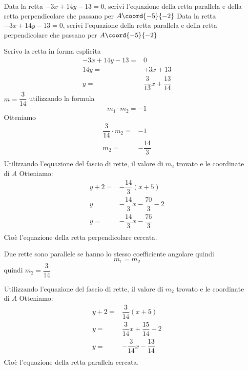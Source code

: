 \begin{exercise}
	Data la retta $-3x+14y-13=0$, scrivi l'equazione della retta parallela e della retta perpendicolare che passano per  $A\coord{-5}{-2}$
	\tcblower
	Data la retta $-3x+14y-13=0$, scrivi l'equazione della retta parallela e della retta perpendicolare che passano per  $A\coord{-5}{-2}$
	
	Scrivo la retta in forma esplicita
	\begin{align*}
		-3x+14y-13=&0\\
		14y=&+3x+13\\
		y=&\dfrac{3}{13}x+\dfrac{13}{14}
	\end{align*}
	$m=\dfrac{3}{14}$ utilizzando la formula \[m_1\cdot m_2=-1\] Otteniamo
	\begin{align*}
		\dfrac{3}{14}\cdot m_2=&-1\\
		m_2=&-\dfrac{14}{3}\\
	\end{align*}
	Utilizzando l'equazione del fascio di rette, il valore di $m_2$ trovato e le coordinate di $A$ Otteniamo:
	\begin{align*}
		y+2=&-\dfrac{14}{3}(x+5)\\
		y=&-\dfrac{14}{3}x-\dfrac{70}{3}-2\\
		y=&-\dfrac{14}{3}x-\dfrac{76}{3}\\
	\end{align*}
	Cioè l'equazione della retta perpendicolare cercata.
	
	Due rette sono parallele se hanno lo stesso coefficiente angolare quindi \[m_1=m_2 \]
	quindi $m_2=\dfrac{3}{14}$ 
	
	Utilizzando l'equazione del fascio di rette, il valore di $m_2$ trovato e le coordinate di $A$ Otteniamo:
	\begin{align*}
		y+2=&\dfrac{3}{14}(x+5)\\
		y=&\dfrac{3}{14}x+\dfrac{15}{14}-2\\
		y=&-\dfrac{3}{14}x-\dfrac{13}{14}\\
	\end{align*}
	Cioè l'equazione della retta parallela cercata.
	
	\begin{center}
		
	\end{center}
\end{exercise}
